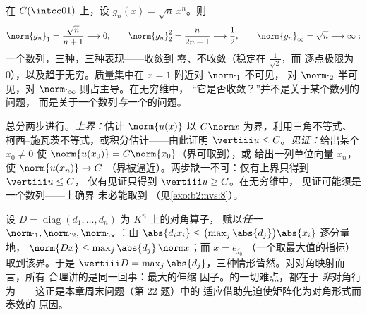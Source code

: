 \begin{example}\label{ex:b2:nvs:sqrtnxn}
在 $C(\intcc01)$ 上，设 $g_n(x) = \sqrt{n}\,x^n$。则
\[
\norm{g_n}_1 = \frac{\sqrt n}{n + 1} \longrightarrow 0,
\qquad
\norm{g_n}_2^2 = \frac{n}{2n + 1} \longrightarrow \frac12,
\qquad
\norm{g_n}_\infty = \sqrt n \longrightarrow \infty :
\]
一个数列，三种，三种表现——收敛到
零、不收敛（稳定在 $\frac1{\sqrt2}$，而
逐点极限为 $0$），以及趋于无穷。质量集中在
$x = 1$ 附近对 $\norm\cdot_1$ 不可见，
对 $\norm\cdot_2$ 半可见，对 $\norm\cdot_\infty$ 则占主导。在无穷维中，
“它是否收敛？”并不是关于某个数列的问题，
而是关于一个数列\emph{与}一个的问题。
\end{example}

\begin{method}[计算算子范数]\label{met:b2:nvs:opnorm}
总分两步进行。\emph{上界：}估计
$\norm{u(x)}$ 以 $C\norm x$ 为界，利用三角不等式、
柯西–施瓦茨不等式，或积分估计——由此证明 $\vertiii u
\leq C$。\emph{见证：}给出某个 $x_0 \neq 0$
使 $\norm{u(x_0)} = C\norm{x_0}$（界可取到），或
给出一列单位向量 $x_n$，使 $\norm{u(x_n)} \to C$
（界被逼近）。两步缺一不可：仅有上界只得到 $\vertiii u \leq C$，
仅有见证只得到 $\vertiii u \geq C$。在无穷维中，
见证可能须是一个数列——上确界
未必能取到
（见\cref{exo:b2:nvs:8}）。
\end{method}

\begin{example}[对角算子对各范数一视同仁]\label{ex:b2:nvs:diagonalnorm}
设 $D = \operatorname{diag}(d_1, \dots, d_n)$ 为 $K^n$ 上的对角算子，
赋以\emph{任一} $\norm\cdot_1, \norm\cdot_2,
\norm\cdot_\infty$：由 $\abs{d_ix_i} \leq
\bigl(\max_j\abs{d_j}\bigr)\abs{x_i}$ 逐分量地，
$\norm{Dx} \leq \max_j\abs{d_j}\,\norm x$；而 $x = e_{j_0}$
（一个取最大值的指标）取到该界。于是 $\vertiii D =
\max_j\abs{d_j}$，三种情形皆然。对对角映射而言，所有
合理讲的是同一回事：最大的伸缩
因子。的一切难点，都在于
\emph{非}对角行为——这正是本章周末问题（第 22 题）中的
适应借助先迫使矩阵化为对角形式而奏效的
原因。
\end{example}

